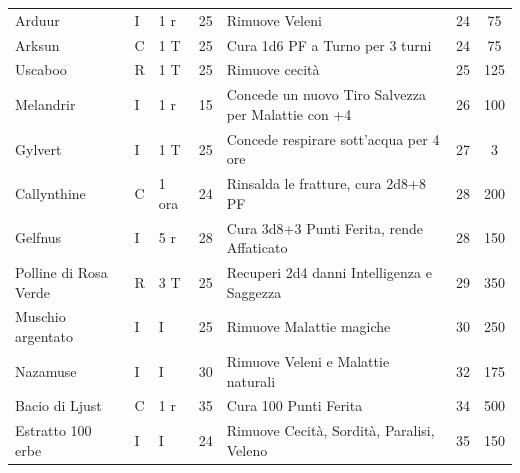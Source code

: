 \begin{xltabular}{\linewidth}{llllXcc}
 Arduur & I& 1 r & 25& Rimuove Veleni& 24 & 75 \\
	Arksun & C& 1 T& 25& Cura 1d6 PF a Turno per 3 turni& 24 & 75 \\
 Uscaboo & R& 1 T & 25& Rimuove cecità& 25 & 125 \\
	Melandrir & I& 1 r & 15& Concede un nuovo Tiro Salvezza per Malattie con +4& 26 & 100 \\
 Gylvert & I& 1 T& 25& Concede respirare sott'acqua per 4 ore & 27 & 3 \\
	Callynthine & C& 1 ora& 24& Rinsalda le fratture, cura 2d8+8 PF & 28 & 200\\
 Gelfnus & I& 5 r & 28& Cura 3d8+3 Punti Ferita, rende Affaticato & 28 & 150 \\
	Polline di Rosa Verde & R& 3 T & 25& Recuperi 2d4 danni Intelligenza e Saggezza& 29 & 350 \\
 Muschio argentato & I& I& 25& Rimuove Malattie magiche & 30 & 250\\
	Nazamuse & I& I& 30& Rimuove Veleni e Malattie naturali & 32 & 175\\
 Bacio di Ljust & C& 1 r & 35& Cura 100 Punti Ferita& 34 & 500\\
	Estratto 100 erbe & I& I& 24& Rimuove Cecità, Sordità, Paralisi, Veleno &35&150 \\
\end{xltabular}


